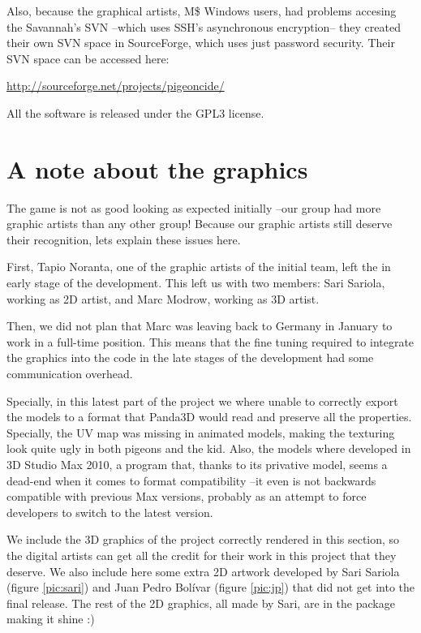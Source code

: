 \documentclass[a4paper,10pt]{article}
\begin{document}
Also, because the graphical artists, M\$ Windows users, had problems
accesing the Savannah's SVN --which uses SSH's asynchronous
encryption-- they created their own SVN space in SourceForge, which
uses just password security. Their SVN space can be accessed here:

\url{http://sourceforge.net/projects/pigeoncide/}

All the software is released under the GPL3 license.

\section{A note about the graphics}

The game is not as good looking as expected initially --our group had
more graphic artists than any other group! Because our graphic artists
still deserve their recognition, lets explain these issues here.

First, Tapio Noranta, one of the graphic artists of the initial team,
left the in early stage of the development. This left us with two
members: Sari Sariola, working as 2D artist, and Marc Modrow, working
as 3D artist.

Then, we did not plan that Marc was leaving back to Germany in January
to work in a full-time position. This means that the fine tuning
required to integrate the graphics into the code in the late stages of
the development had some communication overhead.

Specially, in this latest part of the project we where unable to
correctly export the models to a format that Panda3D would read and
preserve all the properties. Specially, the UV map was missing in
animated models, making the texturing look quite ugly in both pigeons
and the kid. Also, the models where developed in 3D Studio Max 2010, a
program that, thanks to its privative model, seems a dead-end when it
comes to format compatibility --it even is not backwards compatible
with previous Max versions, probably as an attempt to force developers
to switch to the latest version.

We include the 3D graphics of the project correctly rendered in this
section, so the digital artists can get all the credit for their work
in this project that they deserve. We also include here some extra 2D
artwork developed by Sari Sariola (figure \ref{pic:sari}) and Juan Pedro
Bolívar (figure \ref{pic:jp}) that did not get into the final
release. The rest of the 2D graphics, all made by Sari, are in the
package making it shine :)
\end{document}
